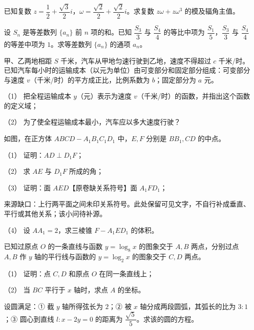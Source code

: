\begin{question}
已知复数 $z=\dfrac12+\dfrac{\sqrt3}{2}i$，$\omega=\dfrac{\sqrt2}{2}+\dfrac{\sqrt2}{2}i$。求复数 $z\omega+z\omega^3$ 的模及辐角主值。

\end{question}
\begin{question}
设 $S_n$ 是等差数列 $\{a_n\}$ 前 $n$ 项的和。已知 $\dfrac{S_3}{3}$ 与 $\dfrac{S_4}{4}$ 的等比中项为 $\dfrac{S_1}{5}$，$\dfrac{S_3}{3}$ 与 $\dfrac{S_4}{4}$ 的等差中项为 $1$。求等差数列 $\{a_n\}$ 的通项 $a_n$。

\end{question}
\begin{question}
甲、乙两地相距 $S$ 千米，汽车从甲地匀速行驶到乙地，速度不得超过 $c$ 千米/时。已知汽车每小时的运输成本（以元为单位）由可变部分和固定部分组成：可变部分与速度 $v$（千米/时）的平方成正比，比例系数为 $b$；固定部分为 $a$ 元。

（1） 把全程运输成本 $y$（元）表示为速度 $v$（千米/时）的函数，并指出这个函数的定义域；

（2） 为了使全程运输成本最小，汽车应以多大速度行驶？

\Needspace{0.4\textheight}
\end{question}
\begin{question}
如图，在正方体 $ABCD-A_1B_1C_1D_1$ 中，$E,F$ 分别是 $BB_1,CD$ 的中点。

（1） 证明：$AD\perp D_1F$；

（2） 求 $AE$ 与 $D_1F$ 所成的角；

（3） 证明：面 $AED$【原卷缺关系符号】面 $A_1FD_1$；

\begin{gktip}
来源缺口：上行两平面之间未印关系符号。此处保留可见文字，不自行补成垂直、平行或其他关系；该小问待补源。
\end{gktip}

（4） 设 $AA_1=2$，求三棱锥 $F-A_1ED_1$ 的体积。
\nopagebreak[4]
\begin{center}\end{center}
\nopagebreak[4]
\end{question}
\begin{question}
已知过原点 $O$ 的一条直线与函数 $y=\log_8x$ 的图象交于 $A,B$ 两点，分别过点 $A,B$ 作 $y$ 轴的平行线与函数的 $y=\log_2x$ 的图象交于 $C,D$ 两点。

（1） 证明：点 $C,D$ 和原点 $O$ 在同一条直线上；

（2） 当 $BC$ 平行于 $x$ 轴时，求点 $A$ 的坐标。

\end{question}
\begin{question}
设圆满足：① 截 $y$ 轴所得弦长为 $2$；② 被 $x$ 轴分成两段圆弧，其弧长的比为 $3:1$；③ 圆心到直线 $l:x-2y=0$ 的距离为 $\dfrac{\sqrt5}{5}$。求该的圆的方程。

\end{question}